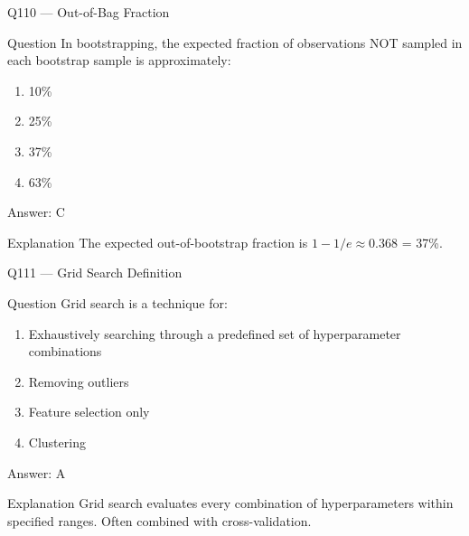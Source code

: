 \documentclass[aspectratio=169,8pt]{beamer}
\begin{document}
	\begin{frame}{Q110 --- Out-of-Bag Fraction}
		\begin{block}{Question}
			In bootstrapping, the expected fraction of observations NOT sampled in each bootstrap sample is approximately:
			\begin{enumerate}
				\item 10\%
				\item 25\%
				\item 37\%
				\item 63\%
			\end{enumerate}
		\end{block}
		\begin{exampleblock}{Answer: C}\end{exampleblock}
		\begin{block}{Explanation}
			The expected out-of-bootstrap fraction is $1 - 1/e \approx 0.368$ = 37\%.
		\end{block}
	\end{frame}
	
	\begin{frame}{Q111 --- Grid Search Definition}
		\begin{block}{Question}
			Grid search is a technique for:
			\begin{enumerate}
				\item Exhaustively searching through a predefined set of hyperparameter combinations
				\item Removing outliers
				\item Feature selection only
				\item Clustering
			\end{enumerate}
		\end{block}
		\begin{exampleblock}{Answer: A}\end{exampleblock}
		\begin{block}{Explanation}
			Grid search evaluates every combination of hyperparameters within specified ranges. Often combined with cross-validation.
		\end{block}
	\end{frame}
	
\end{document}
